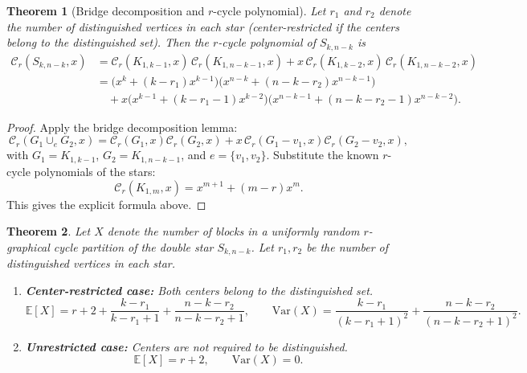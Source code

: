 \documentclass{amsart}
\newtheorem{theorem}{Theorem}[section]
\theoremstyle{definition}
\begin{document}
\begin{theorem}[Bridge decomposition and $r$-cycle polynomial]
\label{thm:double-star-poly}
Let $r_1$ and $r_2$ denote the number of distinguished vertices
in each star (center-restricted if the centers belong to the distinguished set).
Then the $r$-cycle polynomial of $S_{k,n-k}$ is
\begin{equation}
\begin{aligned}
\mathcal{C}_r(S_{k,n-k},x) 
&= \mathcal{C}_r(K_{1,k-1},x)\, \mathcal{C}_r(K_{1,n-k-1},x) 
+ x\, \mathcal{C}_r(K_{1,k-2},x)\, \mathcal{C}_r(K_{1,n-k-2},x) \\
&= \bigl(x^k + (k-r_1) x^{k-1}\bigr) \bigl(x^{n-k} + (n-k-r_2) x^{n-k-1}\bigr) \\
&\quad + x \bigl(x^{k-1} + (k-r_1-1)x^{k-2}\bigr) \bigl(x^{n-k-1} + (n-k-r_2-1)x^{n-k-2}\bigr).
\end{aligned}
\end{equation}
\end{theorem}

\begin{proof}
Apply the bridge decomposition lemma:
\[
\mathcal{C}_r(G_1 \cup_e G_2,x) = \mathcal{C}_r(G_1,x)\mathcal{C}_r(G_2,x) + x\, \mathcal{C}_r(G_1-v_1,x)\mathcal{C}_r(G_2-v_2,x),
\]
with $G_1 = K_{1,k-1}$, $G_2 = K_{1,n-k-1}$, and $e=\{v_1,v_2\}$.
Substitute the known $r$-cycle polynomials of the stars:
\[
\mathcal{C}_r(K_{1,m},x) = x^{m+1} + (m-r) x^m.
\]
This gives the explicit formula above.
\end{proof}

\begin{theorem}
\label{thm:double-star-moments}
Let $X$ denote the number of blocks in a uniformly random $r$-graphical cycle
partition of the double star $S_{k,n-k}$. Let $r_1,r_2$ be the number of distinguished
vertices in each star.

\begin{enumerate}
\item[(i)] \textbf{Center-restricted case:} Both centers belong to the distinguished set.
\[
\mathbb{E}[X]
=
r + 2 + \frac{k-r_1}{k-r_1+1} + \frac{n-k-r_2}{n-k-r_2+1},\qquad
\mathrm{Var}(X)
=
\frac{k-r_1}{(k-r_1+1)^2} + \frac{n-k-r_2}{(n-k-r_2+1)^2}.
\]

\item[(ii)] \textbf{Unrestricted case:} Centers are not required to be distinguished.
\[
\mathbb{E}[X] = r + 2,\qquad
\mathrm{Var}(X) = 0.
\]
\end{enumerate}
\end{theorem}
\end{document}
